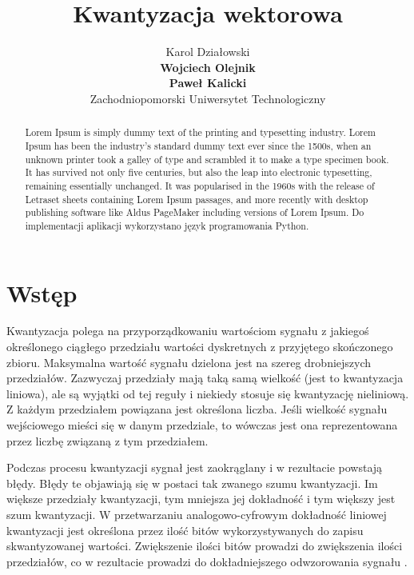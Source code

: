 \documentclass{article}
\title{Kwantyzacja wektorowa}
\author{
  Karol Działowski \\
  \textbf{Wojciech Olejnik} \\
  \textbf{Paweł Kalicki} \\
  Zachodniopomorski Uniwersytet Technologiczny
}
\begin{document}
\maketitle
\begin{abstract}
Lorem Ipsum is simply dummy text of the printing and typesetting industry. Lorem Ipsum has been the industry's standard dummy text ever since the 1500s, when an unknown printer took a galley of type and scrambled it to make a type specimen book. It has survived not only five centuries, but also the leap into electronic typesetting, remaining essentially unchanged. It was popularised in the 1960s with the release of Letraset sheets containing Lorem Ipsum passages, and more recently with desktop publishing software like Aldus PageMaker including versions of Lorem Ipsum. Do implementacji aplikacji wykorzystano język programowania Python.
\end{abstract}

\newpage

\tableofcontents

\newpage



\section{Wstęp}

Kwantyzacja polega na przyporządkowaniu wartościom sygnału z jakiegoś określonego ciągłego przedziału wartości dyskretnych z przyjętego skończonego zbioru. Maksymalna wartość sygnału dzielona jest na szereg drobniejszych przedziałów. Zazwyczaj przedziały mają taką samą wielkość (jest to kwantyzacja liniowa), ale są wyjątki od tej reguły i niekiedy stosuje się kwantyzację nieliniową. Z każdym przedziałem powiązana jest określona liczba. Jeśli wielkość sygnału wejściowego mieści się w danym przedziale, to wówczas jest ona reprezentowana przez liczbę związaną z tym przedziałem.

Podczas procesu kwantyzacji sygnał jest zaokrąglany i w rezultacie powstają błędy. Błędy te objawiają się w postaci tak zwanego szumu kwantyzacji. Im większe przedziały kwantyzacji, tym mniejsza jej dokładność i tym większy jest szum kwantyzacji. W przetwarzaniu analogowo-cyfrowym dokładność liniowej kwantyzacji jest określona przez ilość bitów wykorzystywanych do zapisu skwantyzowanej wartości. Zwiększenie ilości bitów prowadzi do zwiększenia ilości przedziałów, co w rezultacie prowadzi do dokładniejszego odwzorowania sygnału \cite{drozdek2007wprowadzenie}.
\end{document}
